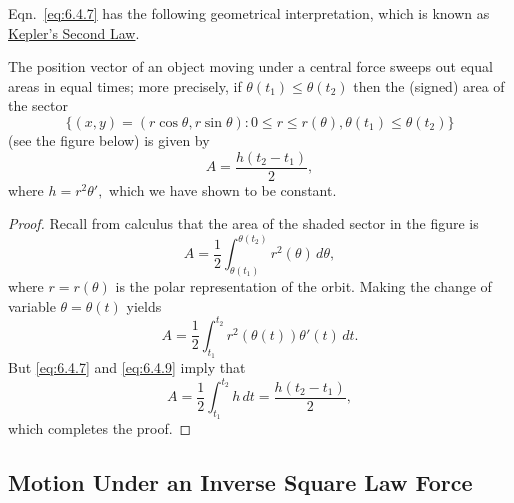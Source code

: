 \documentclass{ximera}
\begin{document}
Eqn.~\eqref{eq:6.4.7} has the following geometrical interpretation, which
is known as
\href{http://www-history.mcs.st-and.ac.uk/Mathematicians/Kepler.html}{Kepler's Second Law}.

\begin{theorem}\label{thmtype:6.4.1}
 The position vector
 of an object moving under a central force
sweeps out equal areas in equal times; more precisely, if
$\theta(t_1)\leq\theta(t_2)$ then the (signed) area of the sector
$$
\{(x,y)=(r\cos\theta,r\sin\theta)  :  0\leq r\leq r(\theta),
\theta(t_1)\leq\theta(t_2)\}
$$
(see the figure below) is given by
$$
A=\frac{h(t_2-t_1)}{2},
$$
where $h=r^2\theta',$ which we have shown to be constant.
\end{theorem}

\begin{center}
\end{center}


\begin{proof}  Recall from calculus that the area of the shaded sector
in the figure is
$$
A=\frac{1}{2}\int_{\theta(t_1)}^{\theta(t_2)} r^2(\theta)\,d\theta,
$$
where $r=r(\theta)$ is the polar representation of the orbit.
Making the change of variable $\theta=\theta(t)$ yields
\begin{equation} \label{eq:6.4.9}
A=\frac{1}{2}\int_{t_1}^{t_2} r^2(\theta(t))\theta'(t)\,dt.
\end{equation}
 But
\eqref{eq:6.4.7}  and \eqref{eq:6.4.9} imply that
$$
A=\frac{1}{2}\int_{t_1}^{t_2} h\,dt=\frac{h(t_2-t_1)}{2},
$$
which completes the proof.
\end{proof}

\subsection*{Motion Under an Inverse Square Law Force}
\end{document}
